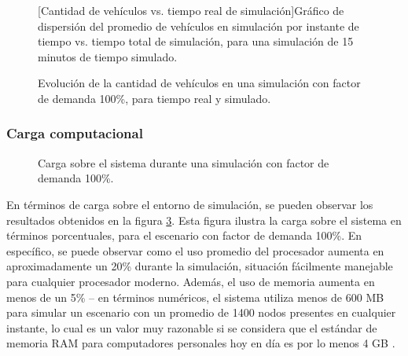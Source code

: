 \begin{figure}[htpb]
    \centering    
    
    [Cantidad de vehículos vs. tiempo real de simulación]{Gráfico de dispersión del promedio de vehículos en simulación por instante de tiempo vs. tiempo total de simulación, para una simulación de 15 minutos de tiempo simulado.}
    \label{fig:vehiclesvstime}
\end{figure}

\begin{figure}[htpb]
    \centering
    
    \caption[Evolución temporal de la cantidad de vehículos en la simulación.]{Evolución de la cantidad de vehículos en una simulación con factor de demanda 100\%, para tiempo real y simulado.}
    \label{fig:timevsvehicles_evolution}
\end{figure}

\subsubsection{Carga computacional}

\begin{figure}[tpb]
    \centering
    
    \caption[Carga sobre el sistema durante una simulación]{Carga sobre el sistema durante una simulación con factor de demanda 100\%.}
    \label{fig:systemload:cpuram}
\end{figure}

En términos de carga sobre el entorno de simulación, se pueden observar los resultados obtenidos en la figura \ref{fig:systemload:cpuram}. Esta figura ilustra la carga sobre el sistema en términos porcentuales, para el escenario con factor de demanda 100\%. En específico, se puede observar como el uso promedio del procesador aumenta en aproximadamente un 20\% durante la simulación, situación fácilmente manejable para cualquier procesador moderno. Además, el uso de memoria aumenta en menos de un 5\% -- en términos numéricos, el sistema utiliza menos de 600 MB para simular un escenario con un promedio de 1400 nodos presentes en cualquier instante, lo cual es un valor muy razonable si se considera que el estándar de memoria RAM para computadores personales hoy en día es por lo menos 4 GB \autocite{steamhwsurvey, unityhardwaresurvey}.

%    

